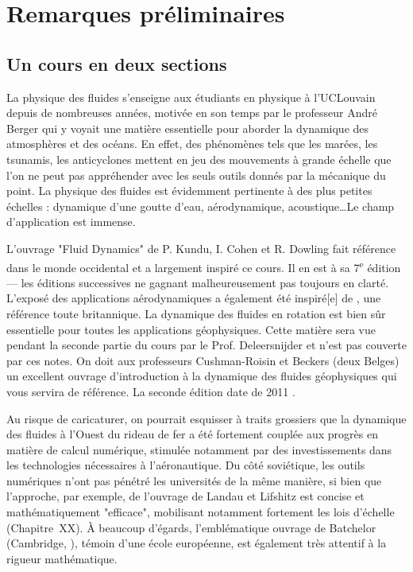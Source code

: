 \chapter*{Remarques préliminaires}

\section{Un cours en deux sections}

La physique des fluides s'enseigne aux étudiants en physique à l'UCLouvain depuis de nombreuses années, motivée en son temps par le professeur André Berger qui y voyait une matière essentielle pour aborder la dynamique des atmosphères et des océans. En effet, des phénomènes tels que les marées, les tsunamis, les anticyclones mettent en jeu des mouvements à grande échelle que l'on ne peut pas appréhender avec les seuls outils donnés par la mécanique du point. La physique des fluides est évidemment pertinente à des plus petites échelles : dynamique d'une goutte d'eau, aérodynamique, acoustique\ldots Le champ d'application est immense. 

L'ouvrage "Fluid Dynamics" de P. Kundu, I. Cohen et R. Dowling fait référence dans le monde occidental et a largement inspiré ce cours. Il en est à sa 7\textsuperscript{e} édition \cite{kundu24aa} — les éditions successives ne gagnant malheureusement pas toujours en clarté. L'exposé des applications aérodynamiques a également été inspiré[e] de \cite{acheson01aa}, une référence toute britannique. La dynamique des fluides en rotation est bien sûr essentielle pour toutes les applications géophysiques. Cette matière sera vue pendant la seconde partie du cours par le Prof. Deleersnijder et n'est pas couverte par ces notes. On doit aux professeurs Cushman-Roisin et Beckers (deux Belges) un excellent ouvrage d'introduction à la dynamique des fluides géophysiques qui vous servira de référence. La seconde édition date de 2011 \cite{cushman-roisin11aa}.

Au risque de caricaturer, on pourrait esquisser à traits grossiers que la dynamique des fluides à l'Ouest du rideau de fer a été fortement couplée aux progrès en matière de calcul numérique, stimulée notamment par des investissements dans les technologies nécessaires à l'aéronautique. Du côté soviétique, les outils numériques n'ont pas pénétré les universités de la même manière, si bien que l'approche, par exemple, de l'ouvrage de Landau et Lifshitz est concise et mathématiquement "efficace", mobilisant notamment fortement les lois d'échelle (Chapitre~XX). À beaucoup d'égards, l'emblématique ouvrage de Batchelor (Cambridge, \cite{batchelor00aa}), témoin d'une école européenne, est également très attentif à la rigueur mathématique.

